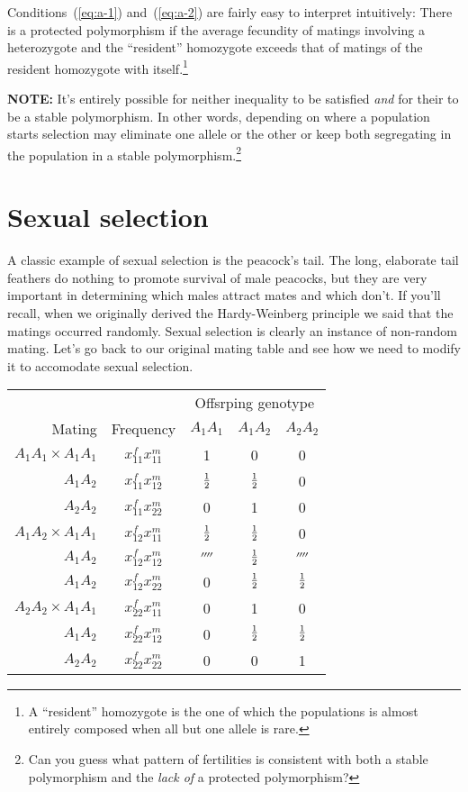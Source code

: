 Conditions~(\ref{eq:a-1}) and~(\ref{eq:a-2}) are fairly easy to
interpret intuitively: There is a protected polymorphism if the
average fecundity of matings involving a heterozygote and the
``resident'' homozygote exceeds that of matings of the resident
homozygote with itself.\footnote{A ``resident'' homozygote is the one
  of which the populations is almost entirely composed when all but
  one allele is rare.}

{\bf NOTE:} It's entirely possible for neither inequality to be
satisfied {\it and\/} for their to be a stable polymorphism. In other
words, depending on where a population starts selection may eliminate
one allele or the other or keep both segregating in the population in
a stable polymorphism.\footnote{Can you guess what pattern of
  fertilities is consistent with both a stable polymorphism and the
  {\it lack of\/} a protected polymorphism?}

\section*{Sexual selection}

A classic example of sexual selection is the peacock's tail. The
long, elaborate tail feathers do nothing to promote survival of male
peacocks, but they are very important in determining which males
attract mates and which don't. If you'll recall, when we originally
derived the Hardy-Weinberg principle we said that the matings occurred
randomly. Sexual selection is clearly an instance of non-random
mating. Let's go back to our original mating table and see how we need
to modify it to accomodate sexual selection.

\begin{center}
\begin{tabular}{rcccc}
                       &           & \multicolumn{3}{c}{Offsrping genotype} \\
Mating                 & Frequency     & $A_1A_1$ & $A_1A_2$ & $A_2A_2$ \\
\hline
$A_1A_1 \times A_1A_1$ & $x_{11}^fx_{11}^m$     &        1 &        0 &        0 \\
              $A_1A_2$ & $x_{11}^fx_{12}^m$ &    $\frac{1}{2}$ &    $\frac{1}{2}$ &        0 \\
              $A_2A_2$ & $x_{11}^fx_{22}^m$ &        0 &        1 &        0 \\
$A_1A_2 \times A_1A_1$ & $x_{12}^fx_{11}^m$ &    $\frac{1}{2}$ &    $\frac{1}{2}$ &        0 \\ 
              $A_1A_2$ & $x_{12}^fx_{12}^m$     &  $\fourth$ &    $\frac{1}{2}$ &  $\fourth$ \\
              $A_1A_2$ & $x_{12}^fx_{22}^m$ &        0 &    $\frac{1}{2}$ &    $\frac{1}{2}$ \\
$A_2A_2 \times A_1A_1$ & $x_{22}^fx_{11}^m$ &        0 &        1 &        0 \\
              $A_1A_2$ & $x_{22}^fx_{12}^m$ &        0 &    $\frac{1}{2}$ &    $\frac{1}{2}$ \\   
              $A_2A_2$ & $x_{22}^fx_{22}^m$     &        0 &
0 & 1 \\
\end{tabular}
\end{center}

